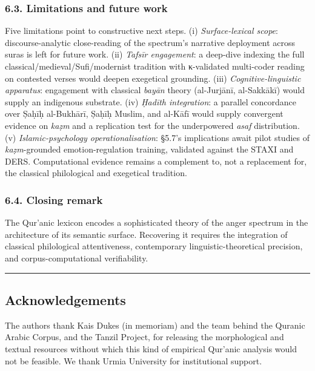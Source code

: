 \documentclass[11pt,a4paper]{article}
\begin{document}
\subsubsection{6.3. Limitations and future
work}\label{limitations-and-future-work}

Five limitations point to constructive next steps. (i)
\emph{Surface-lexical scope}: discourse-analytic close-reading of the
spectrum's narrative deployment across suras is left for future work.
(ii) \emph{Tafsīr engagement}: a deep-dive indexing the full
classical/medieval/Sufi/modernist tradition with κ-validated multi-coder
reading on contested verses would deepen exegetical grounding. (iii)
\emph{Cognitive-linguistic apparatus}: engagement with classical
\emph{bayān} theory (al-Jurjānī, al-Sakkākī) would supply an indigenous
substrate. (iv) \emph{Ḥadīth integration}: a parallel concordance over
Ṣaḥīḥ al-Bukhārī, Ṣaḥīḥ Muslim, and al-Kāfī would supply convergent
evidence on \emph{kaẓm} and a replication test for the underpowered
\emph{asaf} distribution. (v) \emph{Islamic-psychology
operationalisation}: §5.7's implications await pilot studies of
\emph{kaẓm}-grounded emotion-regulation training, validated against the
STAXI and DERS. Computational evidence remains a complement to, not a
replacement for, the classical philological and exegetical tradition.

\subsubsection{6.4. Closing remark}\label{closing-remark}

The Qur'anic lexicon encodes a sophisticated theory of the anger
spectrum in the architecture of its semantic surface. Recovering it
requires the integration of classical philological attentiveness,
contemporary linguistic-theoretical precision, and corpus-computational
verifiability.

\begin{center}\rule{0.5\linewidth}{0.5pt}\end{center}

\subsection{Acknowledgements}\label{acknowledgements}

The authors thank Kais Dukes (in memoriam) and the team behind the
Quranic Arabic Corpus, and the Tanzil Project, for releasing the
morphological and textual resources without which this kind of empirical
Qur'anic analysis would not be feasible. We thank Urmia University for
institutional support.
\end{document}
